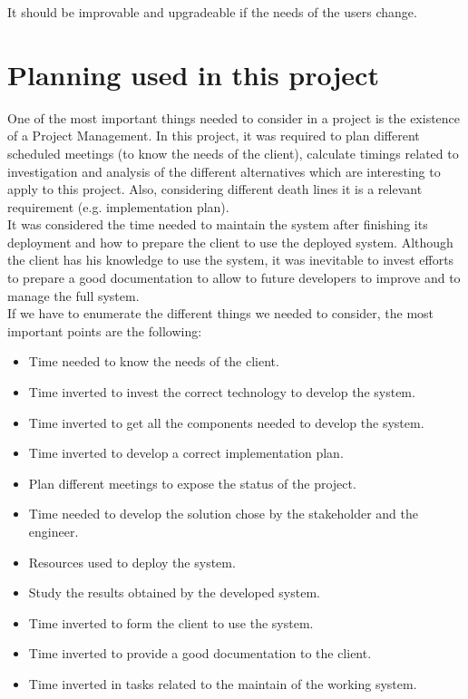 It should be improvable and upgradeable if the needs of the users change.

\section{Planning used in this project}

One of the most important things needed to consider in a project is the existence of a Project Management. In this project, it was required to plan different scheduled meetings (to know the needs of the client), calculate timings related to investigation and analysis of the different alternatives which are interesting to apply to this project. Also, considering different death lines it is a relevant requirement (e.g. implementation plan).\\

It was considered the time needed to maintain the system after finishing its deployment and how to prepare the client to use the deployed system. Although the client has his knowledge to use the system, it was inevitable to invest efforts to prepare a good documentation to allow to future developers to improve and to manage the full system.\\

If we have to enumerate the different things we needed to consider, the most important points are the following:

\begin{itemize}
\item Time needed to know the needs of the client.
\item Time inverted to invest the correct technology to develop the system.
\item Time inverted to get all the components needed to develop the system.
\item Time inverted to develop a correct implementation plan.
\item Plan different meetings to expose the status of the project.
\item Time needed to develop the solution chose by the stakeholder and the engineer.
\item Resources used to deploy the system.
\item Study the results obtained by the developed system.
\item Time inverted to form the client to use the system.
\item Time inverted to provide a good documentation to the client.
\item Time inverted in tasks related to the maintain of the working system.
\end{itemize}

